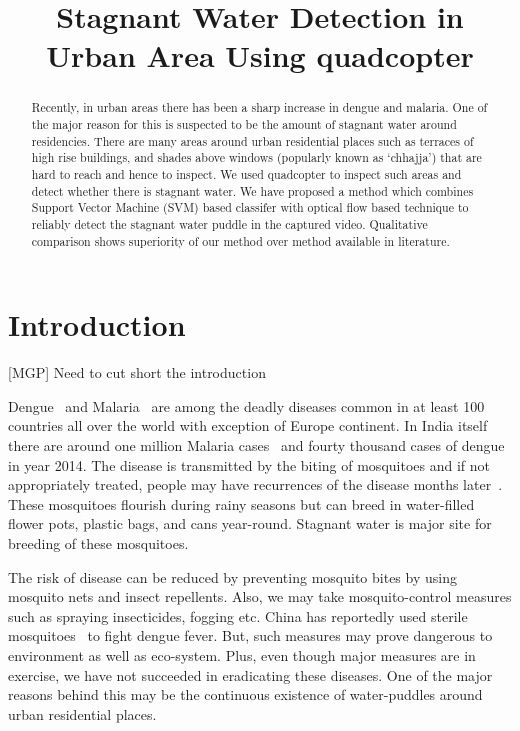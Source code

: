 \documentclass[times,10pt,twocolumn,letterpaper]{article}
\title{Stagnant Water Detection in Urban Area Using quadcopter}
\author{}
\begin{document}
\maketitle

\begin{abstract}
Recently, in urban areas there has been a sharp increase in dengue and malaria.
One of the major reason for this is suspected to be the amount of stagnant
water around residencies. There are many areas around urban residential places
such as terraces of high rise buildings, and shades above windows
(popularly known as `chhajja') that are hard to reach and hence to inspect. We
used quadcopter to inspect such areas and detect whether there is stagnant
water. We have proposed a method which combines Support Vector Machine (SVM)
based classifer with optical flow based technique to reliably detect the
stagnant water puddle in the captured video. Qualitative comparison shows
superiority of our method over method available in literature.

\end{abstract}

\section{Introduction}
{\color{red} [MGP] Need to cut short the introduction}

Dengue~\cite{WHO15Dengue} and Malaria~\cite{WHO15Malaria} are among the deadly
diseases common in at least 100 countries all over the world with exception of
Europe continent. In India itself there are around one million Malaria
cases~\cite{NVBDP_Malaria} and fourty thousand cases of
dengue~\cite{NVBDP_Dengue} in year 2014. The disease is transmitted by the
biting of mosquitoes and if not appropriately treated, people may have
recurrences of the disease months later~\cite{Cecilia14}. These mosquitoes
flourish during rainy seasons but can breed in water-filled flower pots,
plastic bags, and cans year-round. Stagnant water is major site for breeding of
these mosquitoes.

The risk of disease can be reduced by preventing mosquito bites by using
mosquito nets and insect repellents. Also, we may take mosquito-control
measures such as spraying insecticides, fogging etc. China has reportedly
used sterile mosquitoes~\cite{china} to fight dengue fever.  But, such measures
may prove dangerous to environment as well as eco-system. Plus, even though major
measures are in exercise, we have not succeeded in eradicating these diseases. One of
the major reasons behind this may be the continuous existence of water-puddles
around urban residential places.
\end{document}
